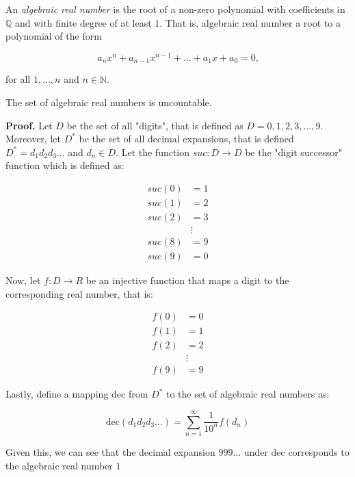 \documentclass[10pt, letterpaper]{article}
\begin{document}
\pagebreak

\begin{definition}
An \textit{algebraic real number} is the root of a non-zero polynomial with coefficients in $\mathbb{Q}$ and with
finite degree of at least $1$. That is, algebraic real number a root to a polynomial of the form

\begin{equation*}
a_n x^n + a_{n-1} x^{n-1} + \ldots + a_1 x + a_0 = 0 \text{,}
\end{equation*}

for all $1, \dots, n$ and $n \in \mathbb{N}$.
\end{definition}

\begin{theorem}
The set of algebraic real numbers is uncountable.

\textbf{Proof.} Let $D$ be the set of all "digits", that is defined as $D = {0, 1, 2, 3, \dots, 9}$. Moreover, let
$D^*$ be the set of all decimal expansions, that is defined $D^* = d_{1} d_{2} d_{3} \ldots$ and $d_{n} \in D$. Let the
function $suc : D \to D$ be the "digit successor" function which is defined as:

\begin{align*}
suc(0) &= 1 \\
suc(1) &= 2 \\
suc(2) &= 3 \\
&\vdots \\
suc(8) &= 9 \\
suc(9) &= 0
\end{align*}

Now, let $f : D \to R$ be an injective function that maps a digit to the corresponding real number, that is:

\begin{align*}
f(0) &= 0 \\
f(1) &= 1 \\
f(2) &= 2 \\
&\vdots \\
f(9) &= 9
\end{align*}

Lastly, define a mapping $\text{dec}$ from $D^*$ to the set of algebraic real numbers as:

\begin{equation*}
\text{dec}(d_{1} d_{2} d_{3} \ldots) = \sum_{n=1}^{\infty} \frac{1}{10^{n}} f(d_{n})
\end{equation*}

Given this, we can see that the decimal expansion $999 \ldots$ under $\text{dec}$ corresponds to the
algebraic real number $1$


\end{theorem}
\end{document}
